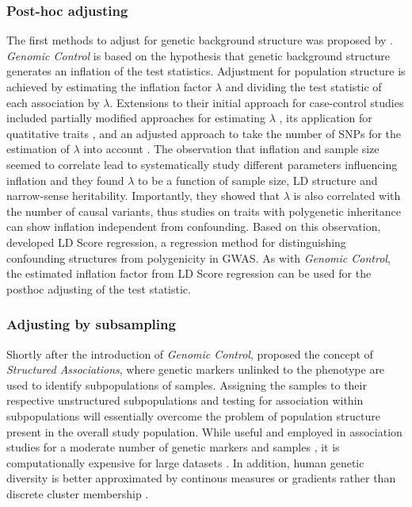 \subsubsection{Post-hoc adjusting}
The first methods to adjust for genetic background structure was proposed by \citet{Devlin1999}. \textit{Genomic Control} is based on the hypothesis that genetic background structure generates an inflation of the test statistics. Adjustment for population structure is achieved by estimating the inflation factor \(\lambda\) and dividing the test statistic of each association by \(\lambda\). Extensions to their initial approach for case-control studies included partially modified approaches for estimating \(\lambda\) \citep{Reich2001}, its application for quatitative traits \citep{Bacanu2002}, and an adjusted approach to take the number of SNPs for the estimation of \(\lambda\) into account \citep{Devlin2004}. The observation that inflation and sample size seemed to correlate lead \citet{Yang2011} to systematically study different parameters influencing inflation and they found \(\lambda\) to be a function of sample size, LD structure and narrow-sense heritability. Importantly, they showed that \(\lambda\) is also correlated with the number of causal variants, thus studies on traits with polygenetic inheritance can show inflation independent from confounding. Based on this observation, \citet{Bulik-Sullivan2015} developed LD Score regression, a regression method for distinguishing confounding structures from polygenicity in GWAS. As with \textit{Genomic Control}, the estimated inflation factor from LD Score regression can be used for the posthoc adjusting of the test statistic. 
\subsubsection{Adjusting by subsampling}
Shortly after the introduction of \textit{Genomic Control}, \citet{Pritchard2000} proposed the concept of \textit{Structured Associations}, where genetic markers unlinked to the phenotype are used to identify subpopulations of samples. Assigning the samples to their respective unstructured subpopulations and testing for association within subpopulations will essentially overcome the problem of population structure present in the overall study population. While useful and employed in association studies for a moderate number of genetic markers and samples \citep{Li2004,Stein2009,Kulbrock2013}, it is computationally expensive for large datasets \citep{Price2006}. In addition, human genetic diversity is better approximated by continous measures or gradients rather than discrete cluster membership \citep{Serre2004,Price2006}.

